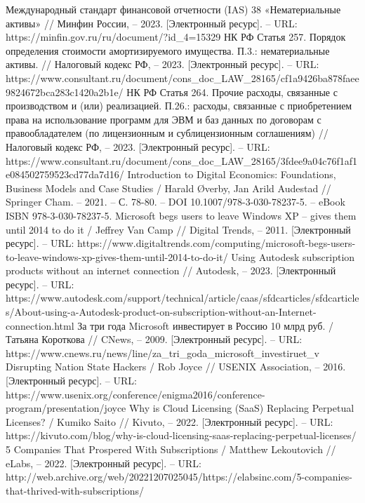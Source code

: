 \documentclass{article}
\begin{document}
\begin{thebibliography}{2}
 Международный стандарт финансовой отчетности (IAS) 38 «Нематериальные активы» // Минфин России, – 2023. [Электронный ресурс]. – URL: https://minfin.gov.ru/ru/document/?id\_4=15329
 НК РФ Статья 257. Порядок определения стоимости амортизируемого имущества. П.3.: нематериальные активы. // Налоговый кодекс РФ, – 2023. [Электронный ресурс]. – URL: https://www.consultant.ru/document/cons\_doc\_LAW\_28165/cf1a9426ba878faee9824672bca283c1420a2b1e/
 НК РФ Статья 264. Прочие расходы, связанные с производством и (или) реализацией. П.26.: расходы, связанные с приобретением права на использование программ для ЭВМ и баз данных по договорам с правообладателем (по лицензионным и сублицензионным соглашениям) // Налоговый кодекс РФ, – 2023. [Электронный ресурс]. – URL: https://www.consultant.ru/document/cons\_doc\_LAW\_28165/3fdee9a04c76f1af1e084502759523cd77da7d16/
 Introduction to Digital Economics: Foundations, Business Models and Case Studies / Harald Øverby, Jan Arild Audestad // Springer Cham. – 2021. – С. 78-80. – DOI 10.1007/978-3-030-78237-5. – eBook ISBN 978-3-030-78237-5.
 Microsoft begs users to leave Windows XP – gives them until 2014 to do it / Jeffrey Van Camp // Digital Trends, – 2011. [Электронный ресурс]. – URL: https://www.digitaltrends.com/computing/microsoft-begs-users-to-leave-windows-xp-gives-them-until-2014-to-do-it/
 Using Autodesk subscription products without an internet connection // Autodesk, – 2023. [Электронный ресурс]. – URL: https://www.autodesk.com/support/technical/article/caas/sfdcarticles/sfdcarticles/About-using-a-Autodesk-product-on-subscription-without-an-Internet-connection.html
 За три года Microsoft инвестирует в Россию 10 млрд руб. / Татьяна Короткова // CNews, – 2009. [Электронный ресурс]. – URL: https://www.cnews.ru/news/line/za\_tri\_goda\_microsoft\_investiruet\_v
 Disrupting Nation State Hackers / Rob Joyce // USENIX Association, – 2016. [Электронный ресурс]. – URL: https://www.usenix.org/conference/enigma2016/conference-program/presentation/joyce
 Why is Cloud Licensing (SaaS) Replacing Perpetual Licenses? / Kumiko Saito // Kivuto, – 2022. [Электронный ресурс]. – URL: https://kivuto.com/blog/why-is-cloud-licensing-saas-replacing-perpetual-licenses/
 5 Companies That Prospered With Subscriptions / Matthew Lekoutovich // eLabs, – 2022. [Электронный ресурс]. – URL: http://web.archive.org/web/20221207025045/https://elabsinc.com/5-companies-that-thrived-with-subscriptions/

\end{thebibliography}
\end{document}
